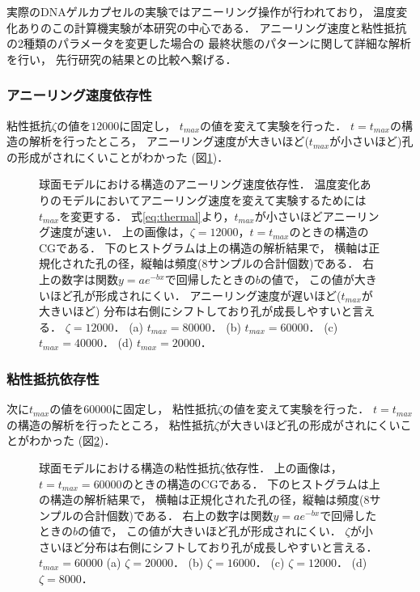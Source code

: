 実際のDNAゲルカプセルの実験ではアニーリング操作が行われており，
温度変化ありのこの計算機実験が本研究の中心である．
アニーリング速度と粘性抵抗の2種類のパラメータを変更した場合の
最終状態のパターンに関して詳細な解析を行い，
先行研究の結果との比較へ繋げる．


\subsubsection{アニーリング速度依存性}
粘性抵抗$\zeta$の値を$12000$に固定し，
$t_{max}$の値を変えて実験を行った．
$t=t_{max}$の構造の解析を行ったところ，
アニーリング速度が大きいほど($t_{max}$が小さいほど)孔の形成がされにくいことがわかった
(図\ref{fig:result_sphere_anearing_speed_comb})．
\begin{figure}
    \centering
    
    \caption{
        球面モデルにおける構造のアニーリング速度依存性．
        温度変化ありのモデルにおいてアニーリング速度を変えて実験するためには$t_{max}$を変更する．
        式\ref{eq:thermal}より，$t_{max}$が小さいほどアニーリング速度が速い．
        上の画像は，$\zeta=12000$，$t=t_{max}$のときの構造のCGである．
        下のヒストグラムは上の構造の解析結果で，
        横軸は正規化された孔の径，縦軸は頻度(8サンプルの合計個数)である．
        右上の数字は関数$y=ae^{-bx}$で回帰したときの$b$の値で，
        この値が大きいほど孔が形成されにくい．
        アニーリング速度が遅いほど($t_{max}$が大きいほど)
        分布は右側にシフトしており孔が成長しやすいと言える．
        $\zeta=12000$．
        (a) $t_{max}=80000$．
        (b) $t_{max}=60000$．
        (c) $t_{max}=40000$．
        (d) $t_{max}=20000$．
    }
    \label{fig:result_sphere_anearing_speed_comb}
\end{figure}


\subsubsection{粘性抵抗依存性}
次に$t_{max}$の値を$60000$に固定し，
粘性抵抗$\zeta$の値を変えて実験を行った．
$t=t_{max}$の構造の解析を行ったところ，
粘性抵抗$\zeta$が大きいほど孔の形成がされにくいことがわかった
(図\ref{fig:result_sphere_friction_constant_comb})．
\begin{figure}
    \centering
    
    \caption{
        球面モデルにおける構造の粘性抵抗$\zeta$依存性．
        上の画像は，$t=t_{max}=60000$のときの構造のCGである．
        下のヒストグラムは上の構造の解析結果で，
        横軸は正規化された孔の径，縦軸は頻度(8サンプルの合計個数)である．
        右上の数字は関数$y=ae^{-bx}$で回帰したときの$b$の値で，
        この値が大きいほど孔が形成されにくい．
        $\zeta$が小さいほど分布は右側にシフトしており孔が成長しやすいと言える．
        $t_{max}=60000$
        (a) $\zeta=20000$．
        (b) $\zeta=16000$．
        (c) $\zeta=12000$．
        (d) $\zeta=8000$．
    }
    \label{fig:result_sphere_friction_constant_comb}
\end{figure}


